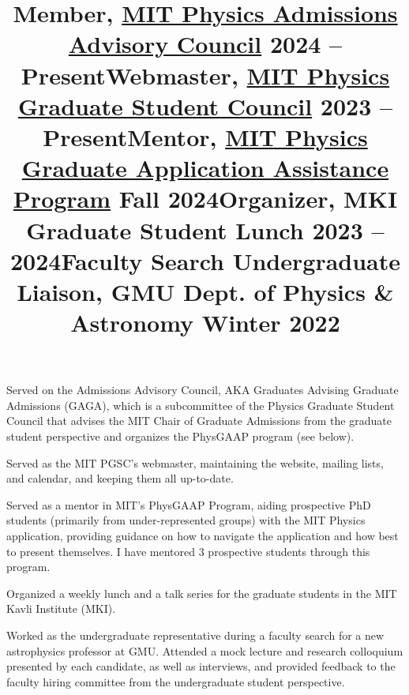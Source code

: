 \documentclass[marg, centered]{res}
\begin{document}
\begin{resume}
\title{\textbf{Member}, \href{https://physics-gsc.scripts.mit.edu/home/gaga/}{\color{dkbu} MIT Physics Admissions Advisory Council} \hfill \textbf{2024 -- Present}}
\begin{position}
{\small Served on the Admissions Advisory Council, AKA Graduates Advising Graduate Admissions (GAGA), which is a subcommittee of the Physics Graduate Student Council that advises the MIT Chair of Graduate Admissions from the graduate student perspective and organizes the PhysGAAP program (see below).}
\end{position}

\title{\textbf{Webmaster}, \href{https://physics-gsc.scripts.mit.edu/home/}{\color{dkbu} MIT Physics Graduate Student Council} \hfill \textbf{2023 -- Present}}
\begin{position}
{\small Served as the MIT PGSC's webmaster, maintaining the website, mailing lists, and calendar, and keeping them all up-to-date.}
\end{position}

\title{\textbf{Mentor}, \href{https://sites.mit.edu/physgaap/}{\color{dkbu} MIT Physics Graduate Application Assistance Program} \hfill \textbf{Fall 2024}}
\begin{position}
{\small Served as a mentor in MIT's PhysGAAP Program, aiding prospective PhD students (primarily from under-represented groups) with the MIT Physics application, providing guidance on how to navigate the application and how best to present themselves.  I have mentored 3 prospective students through this program.}
\end{position}

\title{\textbf{Organizer}, MKI Graduate Student Lunch \hfill \textbf{2023 -- 2024}}
\begin{position}
{\small Organized a weekly lunch and a talk series for the graduate students in the MIT Kavli Institute (MKI).}
\end{position}

\title{\textbf{Faculty Search Undergraduate Liaison}, GMU Dept. of Physics \& Astronomy \hfill \textbf{Winter 2022}}
\begin{position}
{\small Worked as the undergraduate representative during a faculty search for a new astrophysics professor at GMU. Attended a mock lecture and research colloquium presented by each candidate, as well as interviews, and provided feedback to the faculty hiring committee from the undergraduate student perspective.}
\end{position}


\end{resume}
\end{document}
